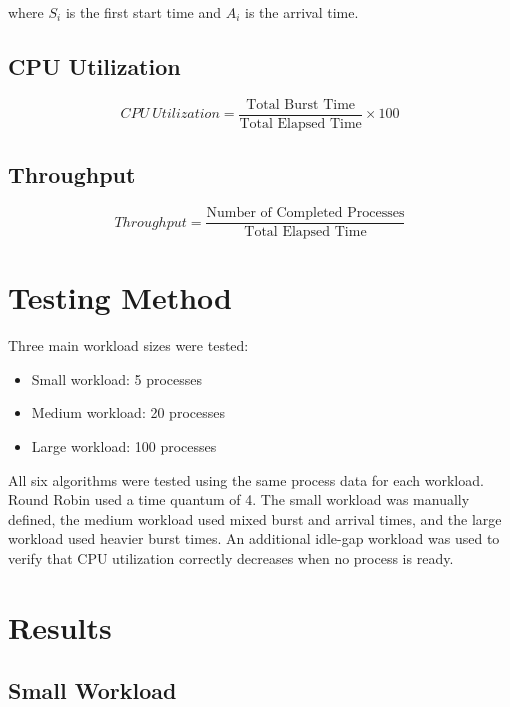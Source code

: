 \documentclass[12pt]{article}
\begin{document}
where \(S_i\) is the first start time and \(A_i\) is the arrival time.

\subsection{CPU Utilization}

\begin{equation}
CPU\ Utilization =
\frac{\text{Total Burst Time}}{\text{Total Elapsed Time}} \times 100
\end{equation}

\subsection{Throughput}

\begin{equation}
Throughput =
\frac{\text{Number of Completed Processes}}{\text{Total Elapsed Time}}
\end{equation}

\section{Testing Method}

Three main workload sizes were tested:

\begin{itemize}
    \item Small workload: 5 processes
    \item Medium workload: 20 processes
    \item Large workload: 100 processes
\end{itemize}

All six algorithms were tested using the same process data for each workload.
Round Robin used a time quantum of 4. The small workload was manually defined,
the medium workload used mixed burst and arrival times, and the large workload
used heavier burst times. An additional idle-gap workload was used to verify
that CPU utilization correctly decreases when no process is ready.

\section{Results}

\subsection{Small Workload}
\end{document}
